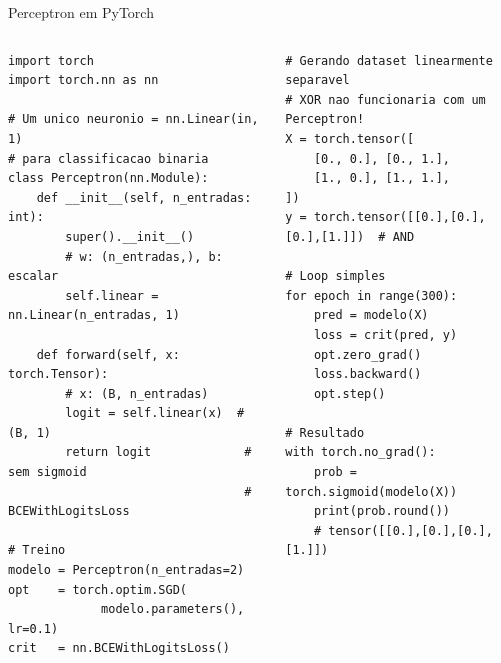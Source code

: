 \documentclass[aspectratio=169, 10pt]{beamer}
\begin{document}

\begin{frame}[fragile]{Perceptron em PyTorch}
\begin{columns}
\begin{lstlisting}
import torch
import torch.nn as nn

# Um unico neuronio = nn.Linear(in, 1)
# para classificacao binaria
class Perceptron(nn.Module):
    def __init__(self, n_entradas: int):
        super().__init__()
        # w: (n_entradas,), b: escalar
        self.linear = nn.Linear(n_entradas, 1)

    def forward(self, x: torch.Tensor):
        # x: (B, n_entradas)
        logit = self.linear(x)  # (B, 1)
        return logit             # sem sigmoid
                                 # BCEWithLogitsLoss

# Treino
modelo = Perceptron(n_entradas=2)
opt    = torch.optim.SGD(
             modelo.parameters(), lr=0.1)
crit   = nn.BCEWithLogitsLoss()
\end{lstlisting}

\begin{lstlisting}
# Gerando dataset linearmente separavel
# XOR nao funcionaria com um Perceptron!
X = torch.tensor([
    [0., 0.], [0., 1.],
    [1., 0.], [1., 1.],
])
y = torch.tensor([[0.],[0.],[0.],[1.]])  # AND

# Loop simples
for epoch in range(300):
    pred = modelo(X)
    loss = crit(pred, y)
    opt.zero_grad()
    loss.backward()
    opt.step()

# Resultado
with torch.no_grad():
    prob = torch.sigmoid(modelo(X))
    print(prob.round())
    # tensor([[0.],[0.],[0.],[1.]])
\end{lstlisting}
\end{columns}
\end{frame}

\end{document}
